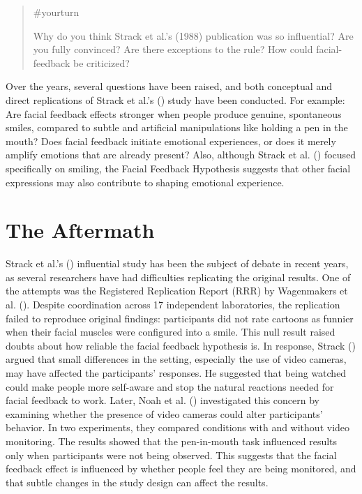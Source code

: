 \documentclass[
  letterpaper,
]{book}
\begin{document}
\begin{quote}
{\#yourturn}

Why do you think Strack et al.'s (1988) publication was so influential?
Are you fully convinced? Are there exceptions to the rule? How could
facial-feedback be criticized?
\end{quote}

Over the years, several questions have been raised, and both conceptual
and direct replications of Strack et al.'s
() study have been conducted.
For example: Are facial feedback effects stronger when people produce
genuine, spontaneous smiles, compared to subtle and artificial
manipulations like holding a pen in the mouth? Does facial feedback
initiate emotional experiences, or does it merely amplify emotions that
are already present? Also, although Strack et al.
() focused specifically on
smiling, the Facial Feedback Hypothesis suggests that other facial
expressions may also contribute to shaping emotional experience.

\section{The Aftermath}\label{the-aftermath-21}

Strack et al.'s ()
influential study has been the subject of debate in recent years, as
several researchers have had difficulties replicating the original
results. One of the attempts was the Registered Replication Report (RRR)
by Wagenmakers et al.
(). Despite coordination
across 17 independent laboratories, the replication failed to reproduce
original findings: participants did not rate cartoons as funnier when
their facial muscles were configured into a smile. This null result
raised doubts about how reliable the facial feedback hypothesis is. In
response, Strack () argued
that small differences in the setting, especially the use of video
cameras, may have affected the participants' responses. He suggested
that being watched could make people more self-aware and stop the
natural reactions needed for facial feedback to work. Later, Noah et al.
() investigated this concern by
examining whether the presence of video cameras could alter
participants' behavior. In two experiments, they compared conditions
with and without video monitoring. The results showed that the
pen-in-mouth task influenced results only when participants were not
being observed. This suggests that the facial feedback effect is
influenced by whether people feel they are being monitored, and that
subtle changes in the study design can affect the results.
\end{document}
